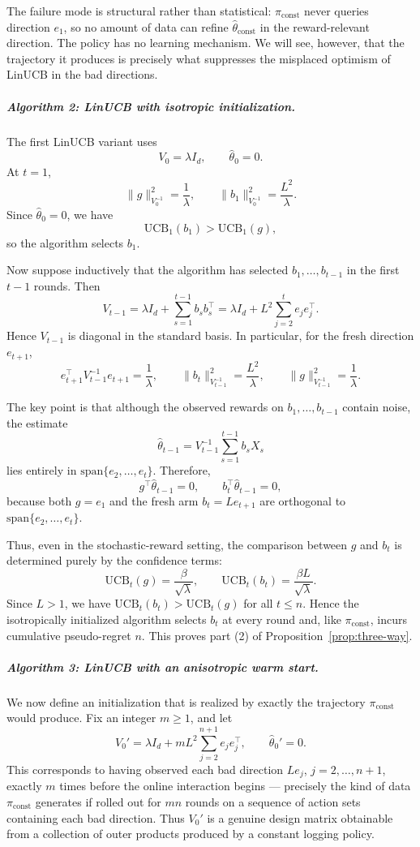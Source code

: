 \documentclass{article}
\theoremstyle{definition}
\theoremstyle{remark}
\theoremstyle{remark}
\begin{document}
The failure mode is structural rather than statistical: $\pi_{\mathrm{const}}$ never queries direction $e_1$, so no amount of data can refine $\hat{\theta}_{\mathrm{const}}$ in the reward-relevant direction. The policy has no learning mechanism. We will see, however, that the trajectory it produces is precisely what suppresses the misplaced optimism of LinUCB in the bad directions.

\subparagraph{Algorithm 2: LinUCB with isotropic initialization.}
The first LinUCB variant uses
\[
V_0=\lambda I_d,
\qquad
\hat{\theta}_0=0.
\]
At $t=1$,
\[
\|g\|_{V_0^{-1}}^2=\frac{1}{\lambda},
\qquad
\|b_1\|_{V_0^{-1}}^2=\frac{L^2}{\lambda}.
\]
Since $\hat{\theta}_0=0$, we have
\[
\mathrm{UCB}_1(b_1)>\mathrm{UCB}_1(g),
\]
so the algorithm selects $b_1$.

Now suppose inductively that the algorithm has selected $b_1,\dots,b_{t-1}$ in the first $t-1$ rounds. Then
\[
V_{t-1}
=
\lambda I_d+\sum_{s=1}^{t-1} b_s b_s^\top
=
\lambda I_d + L^2\sum_{j=2}^{t} e_j e_j^\top.
\]
Hence $V_{t-1}$ is diagonal in the standard basis. In particular, for the fresh direction $e_{t+1}$,
\[
e_{t+1}^\top V_{t-1}^{-1} e_{t+1}=\frac{1}{\lambda},
\qquad
\|b_t\|_{V_{t-1}^{-1}}^2=\frac{L^2}{\lambda},
\qquad
\|g\|_{V_{t-1}^{-1}}^2=\frac{1}{\lambda}.
\]

The key point is that although the observed rewards on $b_1,\dots,b_{t-1}$ contain noise, the estimate
\[
\hat{\theta}_{t-1}
=
V_{t-1}^{-1}\sum_{s=1}^{t-1} b_s X_s
\]
lies entirely in $\mathrm{span}\{e_2,\dots,e_t\}$. Therefore,
\[
g^\top \hat{\theta}_{t-1}=0,
\qquad
b_t^\top \hat{\theta}_{t-1}=0,
\]
because both $g=e_1$ and the fresh arm $b_t=L e_{t+1}$ are orthogonal to $\mathrm{span}\{e_2,\dots,e_t\}$.

Thus, even in the stochastic-reward setting, the comparison between $g$ and $b_t$ is determined purely by the confidence terms:
\[
\mathrm{UCB}_t(g)=\frac{\beta}{\sqrt{\lambda}},
\qquad
\mathrm{UCB}_t(b_t)=\frac{\beta L}{\sqrt{\lambda}}.
\]
Since $L>1$, we have $\mathrm{UCB}_t(b_t)>\mathrm{UCB}_t(g)$ for all $t\le n$. Hence the isotropically initialized algorithm selects $b_t$ at every round and, like $\pi_{\mathrm{const}}$, incurs cumulative pseudo-regret $n$. This proves part (2) of Proposition~\ref{prop:three-way}.

\subparagraph{Algorithm 3: LinUCB with an anisotropic warm start.}
We now define an initialization that is realized by exactly the trajectory $\pi_{\mathrm{const}}$ would produce. Fix an integer $m\ge 1$, and let
\[
V_0'
=
\lambda I_d + mL^2 \sum_{j=2}^{n+1} e_j e_j^\top,
\qquad
\hat{\theta}_0'=0.
\]
This corresponds to having observed each bad direction $L e_j$, $j=2,\dots,n+1$, exactly $m$ times before the online interaction begins --- precisely the kind of data $\pi_{\mathrm{const}}$ generates if rolled out for $mn$ rounds on a sequence of action sets containing each bad direction. Thus $V_0'$ is a genuine design matrix obtainable from a collection of outer products produced by a constant logging policy.
\end{document}
